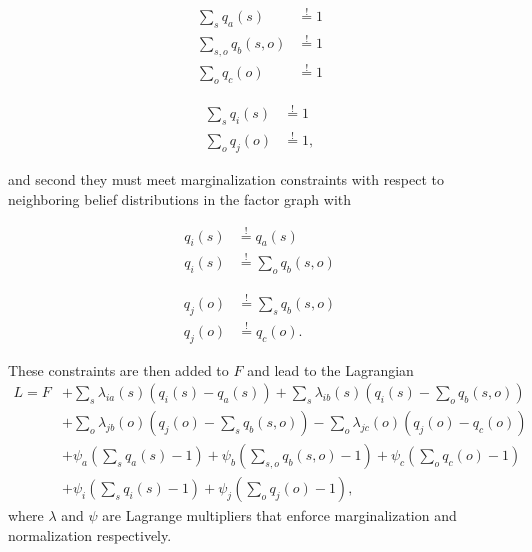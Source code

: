 \noindent
\begin{minipage}[t]{0.5\textwidth}
    \setlength{\abovedisplayskip}{0pt}
    \setlength{\belowdisplayskip}{0pt}
    \begin{align}
        \sum_s q_a(s)       & \overset{!}{=} 1 \\[0.1em]
        \sum_{s,o} q_b(s,o) & \overset{!}{=} 1 \\
        \sum_o q_c(o)       & \overset{!}{=} 1
    \end{align}
\end{minipage}\hfill
\begin{minipage}[t]{0.5\textwidth}
    \setlength{\abovedisplayskip}{0pt}
    \setlength{\belowdisplayskip}{0pt}
    \begin{align}
        \sum_s q_i(s) & \overset{!}{=} 1  \\
        \sum_o q_j(o) & \overset{!}{=} 1,
    \end{align}
\end{minipage}
and second they must meet marginalization constraints with respect to neighboring belief distributions in the factor graph with

\noindent
\begin{minipage}[t]{0.5\textwidth}
    \setlength{\abovedisplayskip}{0pt}
    \setlength{\belowdisplayskip}{0pt}
    \begin{align}
        q_i(s) & \overset{!}{=} q_a(s)          \\[0.8em]
        q_i(s) & \overset{!}{=} \sum_o q_b(s,o)
    \end{align}
\end{minipage}\hfill
\begin{minipage}[t]{0.5\textwidth}
    \setlength{\abovedisplayskip}{0pt}
    \setlength{\belowdisplayskip}{0pt}
    \begin{align}
        q_j(o) & \overset{!}{=} \sum_s q_b(s,o) \\
        q_j(o) & \overset{!}{=} q_c(o).
    \end{align}
\end{minipage}

These constraints are then added to \(F\) and lead to the Lagrangian
\begin{equation}
    \begin{split}
        L = F & + \sum_s \lambda_{ia}(s) (q_i(s) - q_a(s)) + \sum_s \lambda_{ib}(s) (q_i(s) - \sum_o q_b(s,o)) \\
              & + \sum_o \lambda_{jb}(o) (q_j(o) - \sum_s q_b(s,o)) - \sum_o \lambda_{jc}(o) (q_j(o) - q_c(o)) \\
              & + \psi_a (\sum_s q_a(s) - 1) + \psi_b (\sum_{s,o} q_b(s,o) - 1) + \psi_c (\sum_o q_c(o) - 1)   \\
              & + \psi_i (\sum_s q_i(s) - 1) + \psi_j (\sum_o q_j(o) - 1),
    \end{split}
    \label{eq:36}
\end{equation}
where \(\lambda\) and \(\psi\) are Lagrange multipliers that enforce marginalization and normalization respectively.

